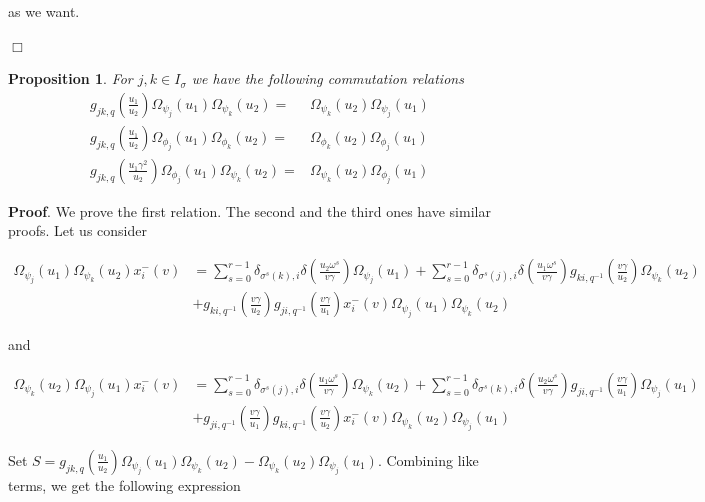 \documentclass[12pt]{amsart}
\newtheorem{prop}[thm]{Proposition}
\numberwithin{equation}{section}
\newcommand{\dem }{\noindent\textbf{Proof}. }
\newcommand{\findem }{\hfill $\Box$ \vskip0.5cm }
\begin{document}
as we want. 

\findem

\begin{prop}\label{Omega_commrealtions}
    For $j,k\in I_\sigma$ we have the following commutation relations
    \begin{align}
        g_{jk,q}\left(\frac{u_1}{u_2}\right)\Omega_{\psi_j}(u_1)\Omega_{\psi_k}(u_2) =& \Omega_{\psi_k}(u_2)\Omega_{\psi_j}(u_1) \label{eq_comm03_gen}\\
        g_{jk,q}\left(\frac{u_1}{u_2}\right)\Omega_{\phi_j}(u_1)\Omega_{\phi_k}(u_2) =& \Omega_{\phi_k}(u_2)\Omega_{\phi_j}(u_1)\\
        g_{jk,q}\left(\frac{u_1\gamma^2}{u_2}\right)\Omega_{\phi_j}(u_1)\Omega_{\psi_k}(u_2) =& \Omega_{\psi_k}(u_2)\Omega_{\phi_j}(u_1)
    \end{align}

\end{prop}

\dem We prove the first relation. The second and the third ones have similar proofs. Let us consider 

\begin{align*}\Omega_{\psi_j}(u_1)\Omega_{\psi_k}(u_2)x_i^{-}(v) &= \sum_{s=0}^{r-1}\delta_{\sigma^s(k),i}\delta\left(\frac{u_2\omega^s}{v\gamma} \right)\Omega_{\psi_j}(u_1) + \sum_{s=0}^{r-1} \delta_{\sigma^s(j),i}\delta\left(\frac{u_1\omega^{s}}{v\gamma}\right)g_{ki,q^{-1}}\left(\frac{v\gamma}{u_2}\right)\Omega_{\psi_k}(u_2)\\
&+ g_{ki,q^{-1}}\left(\frac{v\gamma }{u_2}\right)g_{ji,q^{-1}}\left(\frac{v\gamma}{u_1}\right)x_i^{-}(v)\Omega_{\psi_j}(u_1)\Omega_{\psi_k}(u_2)
\end{align*}

and 

\begin{align*}\Omega_{\psi_k}(u_2)\Omega_{\psi_j}(u_1)x_i^{-}(v) &= \sum_{s=0}^{r-1}\delta_{\sigma^s(j),i}\delta\left(\frac{u_1\omega^s}{v\gamma} \right)\Omega_{\psi_k}(u_2) + \sum_{s=0}^{r-1} \delta_{\sigma^s(k),i}\delta\left(\frac{u_2\omega^{s}}{v\gamma}\right)g_{ji,q^{-1}}\left(\frac{v\gamma}{u_1}\right)\Omega_{\psi_j}(u_1)\\
&+ g_{ji,q^{-1}}\left(\frac{v\gamma }{u_1}\right)g_{ki,q^{-1}}\left(\frac{v\gamma}{u_2}\right)x_i^{-}(v)\Omega_{\psi_k}(u_2)\Omega_{\psi_j}(u_1)
\end{align*}

Set $S = g_{jk,q}\left(\frac{u_1}{u_2}\right)\Omega_{\psi_j}(u_1)\Omega_{\psi_k}(u_2) - \Omega_{\psi_k}(u_2)\Omega_{\psi_j}(u_1)$. Combining like terms, we get the following expression
\end{document}
